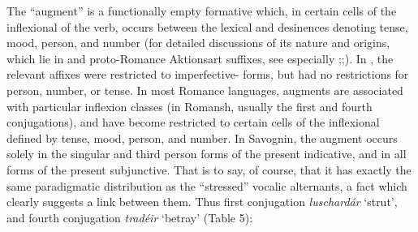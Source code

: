\documentclass[output=paper,
modfonts
]{LSP/langsci}
\begin{document}
The ``augment'' is a functionally empty formative which, in certain cells
of the inflexional  of the verb, occurs between the lexical 
and desinences denoting tense, mood, person, and number (for detailed
discussions of its nature and origins, which lie in  and
proto-Romance Aktionsart suffixes, see especially \citealt{maiden2003};\citeyear[249--53]{maiden2011c};\citeyear[715f.]{maiden2016}). In , the relevant affixes were
restricted to imperfective- forms, but had no restrictions for
person, number, or tense. In most Romance languages, augments are
associated with particular inflexion classes (in Romansh, usually the
first and fourth conjugations), and have become restricted to certain
cells of the inflexional  defined by tense, mood, person, and
number. In Savognin, the augment occurs solely in the singular and third
person forms of the present indicative, and in all forms of the present
subjunctive. That is to say, of course, that it has exactly the same
paradigmatic distribution as the ``stressed'' vocalic alternants, a fact
which clearly suggests a link between them. Thus first conjugation
\emph{luschardár} `strut', and fourth conjugation \emph{tradéir}
`betray' (Table 5):
 
\end{document}
